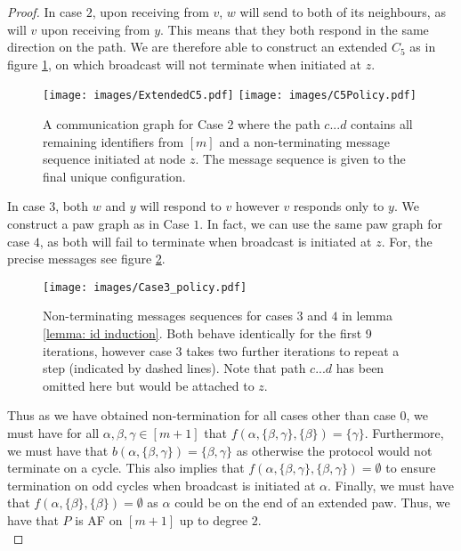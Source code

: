 \begin{proof}
    In case $2$, upon receiving from $v$, $w$ will send to both of its neighbours, as will $v$ upon receiving from $y$.
    This means that they both respond in the same direction on the path.
    We are therefore able to construct an extended $C_5$ as in figure \ref{fig:C5}, on which broadcast will not terminate when initiated at $z$.\\
    \begin{figure}
        \centering
        \texttt{[image: images/ExtendedC5.pdf]}
        \texttt{[image: images/C5Policy.pdf]}
        \caption{A communication graph for Case 2 where the path $c...d$ contains all remaining identifiers from $[m]$ and a non-terminating message sequence initiated at node $z$. The message sequence is given to the final unique configuration.}
        \label{fig:C5}
    \end{figure}
    In case $3$, both $w$ and $y$ will respond to $v$ however $v$ responds only to $y$.
    We construct a paw graph as in Case $1$. 
    In fact, we can use the same paw graph for case $4$, as both will fail to terminate when broadcast is initiated at $z$.
    For, the precise messages see figure \ref{fig: Cases3 and 4}.\\
    \begin{figure}
        \centering
        \texttt{[image: images/Case3\_policy.pdf]}
        \caption{Non-terminating messages sequences for cases $3$ and $4$ in lemma \ref{lemma: id induction}. Both behave identically for the first 9 iterations, however case $3$ takes two further iterations to repeat a step (indicated by dashed lines). Note that path $c...d$ has been omitted here but would be attached to $z$.}
        \label{fig: Cases3 and 4}
    \end{figure}
    Thus as we have obtained non-termination for all cases other than case $0$, we must have for all $\alpha,\beta,\gamma \in [m+1]$ that $f(\alpha, \{\beta, \gamma\}, \{\beta\})=\{\gamma\}$.
    Furthermore, we must have that $b(\alpha, \{\beta, \gamma\})=\{\beta,\gamma\}$ as otherwise the protocol would not terminate on a cycle.
    This also implies that $f(\alpha, \{\beta,\gamma\},\{\beta,\gamma\})=\emptyset$ to ensure termination on odd cycles when broadcast is initiated at $\alpha$.
    Finally, we must have that $f(\alpha,\{\beta\},\{\beta\})=\emptyset$ as $\alpha$ could be on the end of an extended paw.
    Thus, we have that $P$ is AF on $[m+1]$ up to degree $2$.\\


\end{proof}
